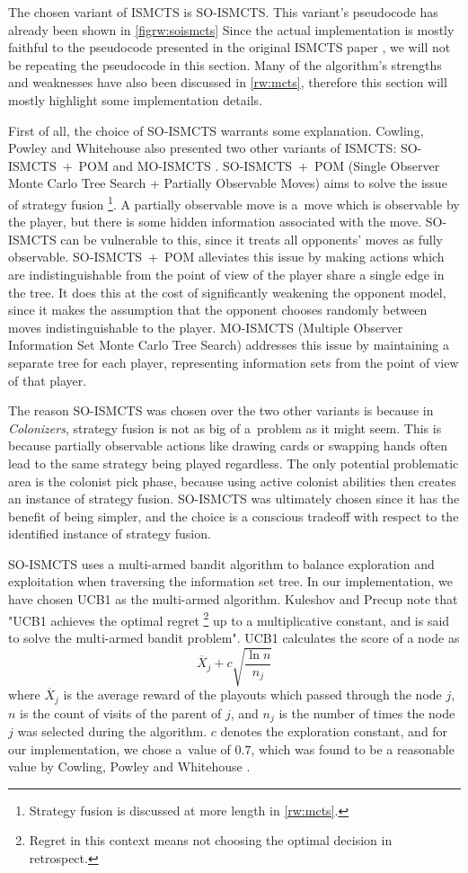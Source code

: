 The chosen variant of ISMCTS is SO-ISMCTS. This variant's pseudocode
has already been shown in \autoref{figrw:soismcts} Since the actual
implementation is mostly faithful to the pseudocode presented in the original
ISMCTS paper \cite{Cowling12}, we will not be repeating the pseudocode in this section.
Many of the algorithm's strengths and weaknesses have also been discussed in
\autoref{rw:mcts}, therefore this section will mostly highlight some implementation
details.

First of all, the choice of SO-ISMCTS warrants some explanation. Cowling, Powley
and Whitehouse also presented two other variants of ISMCTS: SO-ISMCTS~+~POM and
MO-ISMCTS \cite{Cowling12}. SO-ISMCTS~+~POM (Single Observer Monte Carlo
Tree Search + Partially Observable Moves) aims to solve the issue of
strategy fusion
\footnote{Strategy fusion is discussed at more length in \autoref{rw:mcts}.}.
A partially observable move is a~move which is observable by the player, but there
is some hidden information associated with the move.
SO-ISMCTS can be vulnerable to this, since it treats all
opponents' moves as fully observable. SO-ISMCTS~+~POM alleviates this issue
by making actions which are indistinguishable from the point of view of the player
share a single edge in the tree. It does this at the cost of significantly weakening
the opponent model, since it makes the assumption that the opponent chooses randomly
between moves indistinguishable to the player. MO-ISMCTS (Multiple Observer Information
Set Monte Carlo Tree Search) addresses this issue by maintaining a separate tree
for each player, representing information sets from the point of view of that player.

The reason SO-ISMCTS was chosen over the two other variants is because in \emph{Colonizers},
strategy fusion is not as big of a~problem as it might seem. This is because
partially observable actions like drawing cards or swapping hands often lead to the
same strategy being played regardless. The only potential problematic area
is the colonist pick phase, because using active colonist abilities then
creates an instance of strategy fusion. SO-ISMCTS was ultimately chosen
since it has the benefit of being simpler, and the choice is a conscious
tradeoff with respect to the identified instance of strategy fusion.

SO-ISMCTS uses a multi-armed bandit algorithm to balance exploration
and exploitation when traversing the information set tree.
In our implementation, we have chosen UCB1 as the multi-armed algorithm.
Kuleshov and Precup \cite{Kuleshov00} note that "UCB1 achieves the optimal regret
\footnote{Regret in this context means not choosing the optimal decision in
retrospect.} up to a
multiplicative constant, and is said to solve the multi-armed bandit problem".
UCB1 calculates the score of a node as
$$\overline{X}_{j} + c\sqrt{\frac{\ln{n}}{n_{j}}}$$
where $\overline{X}_{j}$ is the average reward of the playouts which passed through
the node $j$, $n$ is the count of visits of the parent of $j$, and $n_{j}$
is the number of times the node $j$ was selected during the algorithm.
$c$ denotes the exploration constant, and for our implementation, we chose a~value
of $0.7$, which was found to be a reasonable value by Cowling, Powley and Whitehouse
\cite{Cowling12}.

